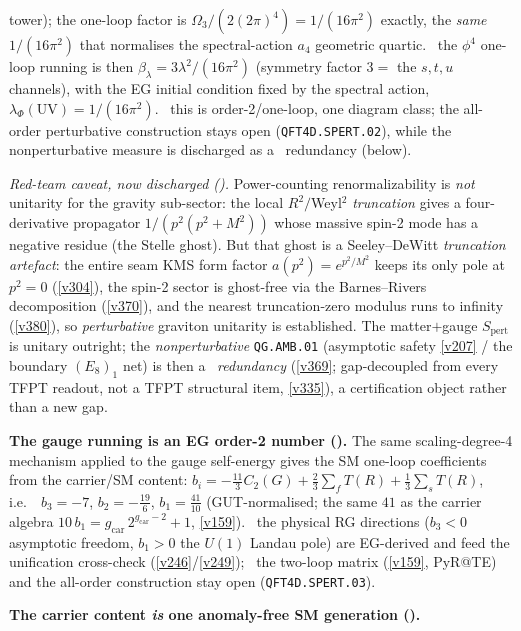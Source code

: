 \documentclass[11pt,a4paper]{article}
\newcommand{\gcar}{g_{\mathrm{car}}}
\begin{document}
\begin{keybox}
tower); the one-loop factor is $\Omega_3/(2(2\pi)^4)=1/(16\pi^2)$ exactly, the \emph{same} $1/(16\pi^2)$ that
normalises the spectral-action $a_4$ geometric quartic. \mC\ the $\phi^4$ one-loop running is then
$\beta_\lambda=3\lambda^2/(16\pi^2)$ (symmetry factor $3=$ the $s,t,u$ channels), with the EG initial condition
fixed by the spectral action, $\lambda_\Phi(\mathrm{UV})=1/(16\pi^2)$. \mO\ this is order-2/one-loop, one
diagram class; the all-order perturbative construction stays open (\texttt{QFT4D.SPERT.02}), while the
nonperturbative measure is discharged as a \mC\ redundancy (below).
\par\smallskip\noindent\emph{Red-team caveat, now discharged ().} Power-counting
renormalizability is \emph{not} unitarity for the gravity sub-sector: the local $R^2/$Weyl$^2$ \emph{truncation}
gives a four-derivative propagator $1/(p^2(p^2+M^2))$ whose massive spin-2 mode has a negative residue (the Stelle
ghost). But that ghost is a Seeley--DeWitt \emph{truncation artefact}: the entire seam KMS form factor
$a(p^2){=}e^{p^2/M^2}$ keeps its only pole at $p^2{=}0$ (\vref{v304}), the spin-2 sector is ghost-free via the
Barnes--Rivers decomposition (\vref{v370}), and the nearest truncation-zero modulus runs to infinity (\vref{v380}),
so \emph{perturbative} graviton unitarity is established. The matter$+$gauge $S_{\mathrm{pert}}$ is unitary outright;
the \emph{nonperturbative} \texttt{QG.AMB.01} (asymptotic safety \vref{v207} / the boundary $(E_8)_1$ net) is then a
\mC\ \emph{redundancy} (\vref{v369}; gap-decoupled from every TFPT readout, not a TFPT structural item, \vref{v335}),
a certification object rather than a new gap.
\par\smallskip\noindent\textbf{The gauge running is an EG order-2 number ().}
The same scaling-degree-4 mechanism applied to the gauge self-energy gives the SM one-loop coefficients from the
carrier/SM content: $b_i=-\tfrac{11}{3}C_2(G)+\tfrac23\sum_f T(R)+\tfrac13\sum_s T(R)$, i.e.\ \mE\
$b_3=-7$, $b_2=-\tfrac{19}{6}$, $b_1=\tfrac{41}{10}$ (GUT-normalised; the same $41$ as the carrier algebra
$10\,b_1=\gcar\,2^{\gcar-2}+1$, \vref{v159}). \mC\ the physical RG directions ($b_3<0$ asymptotic freedom, $b_1>0$
the $U(1)$ Landau pole) are EG-derived and feed the unification cross-check (\vref{v246}/\vref{v249}); \mO\ the
two-loop matrix (\vref{v159}, PyR@TE) and the all-order construction stay open (\texttt{QFT4D.SPERT.03}).
\par\smallskip\noindent\textbf{The carrier content \emph{is} one anomaly-free SM generation ().}

\end{keybox}
\end{document}
